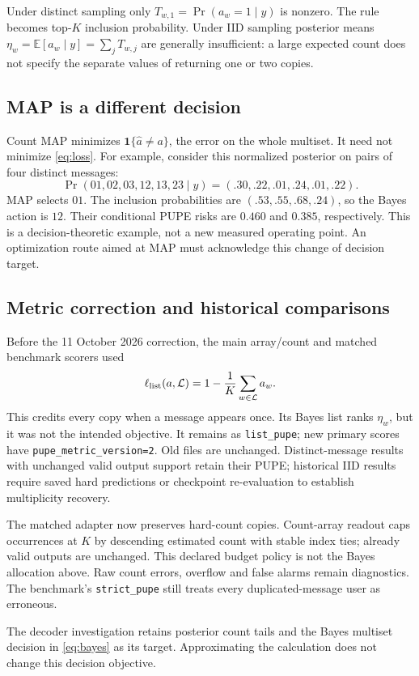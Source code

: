 \documentclass[10pt,a4paper]{article}
\newcommand{\E}{\mathbb E}
\newcommand{\ind}{\mathbf 1}
\begin{document}
Under distinct sampling only $T_{w,1}=\Pr(a_w=1\mid y)$ is nonzero. The rule becomes top-$K$ inclusion probability.
Under IID sampling posterior means $\eta_w=\E[a_w\mid y]=\sum_jT_{w,j}$ are generally insufficient: a large
expected count does not specify the separate values of returning one or two copies.

\subsection{MAP is a different decision}
Count MAP minimizes $\ind\{\widehat a\ne a\}$, the error on the whole multiset. It need not minimize
\eqref{eq:loss}. For example, consider this normalized posterior on pairs of four distinct messages:
\[
 \Pr(01,02,03,12,13,23\mid y)=(.30,.22,.01,.24,.01,.22).
\]
MAP selects $01$. The inclusion probabilities are $(.53,.55,.68,.24)$, so the Bayes action is $12$.
Their conditional PUPE risks are $0.460$ and $0.385$, respectively. This is a decision-theoretic example, not a new
measured operating point. An optimization route aimed at MAP must acknowledge this change of decision target.

\subsection{Metric correction and historical comparisons}
Before the 11 October 2026 correction, the main array/count and matched benchmark scorers used
\[
 \ell_{\rm list}(a,\mathcal L)=1-\frac1K\sum_{w\in\mathcal L}a_w.
\]
This credits every copy when a message appears once. Its Bayes list ranks $\eta_w$, but it was not the intended
objective. It remains as \texttt{list\_pupe}; new primary scores have \texttt{pupe\_metric\_version=2}.
Old files are unchanged. Distinct-message results with unchanged valid output support retain their PUPE;
historical IID results require saved hard predictions or checkpoint re-evaluation to establish multiplicity recovery.

The matched adapter now preserves hard-count copies. Count-array readout caps occurrences at $K$ by descending
estimated count with stable index ties; already valid outputs are unchanged. This declared budget policy is not
the Bayes allocation above. Raw count errors, overflow and false alarms remain diagnostics.
The benchmark's \texttt{strict\_pupe} still treats every duplicated-message user as erroneous.

The decoder investigation retains posterior count tails and the Bayes multiset decision in \eqref{eq:bayes}
as its target. Approximating the calculation does not change this decision objective.
\end{document}
